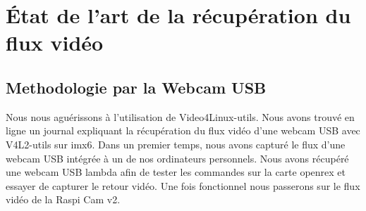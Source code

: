 
\chapter{État de l'art de la récupération du flux vidéo} %

\label{Chapter5} %


\section{Methodologie par la Webcam USB}

Nous nous aguérissons à l’utilisation de Video4Linux-utils. Nous avons trouvé en
ligne un journal expliquant la récupération du flux vidéo d’une webcam USB avec
V4L2-utils sur imx6. Dans un premier temps, nous avons capturé le flux d’une
webcam USB intégrée à un de nos ordinateurs personnels. Nous avons récupéré une
webcam USB lambda afin de tester les commandes sur la carte openrex et essayer
de capturer le retour vidéo. Une fois fonctionnel nous passerons sur le flux
vidéo de la Raspi Cam v2.

